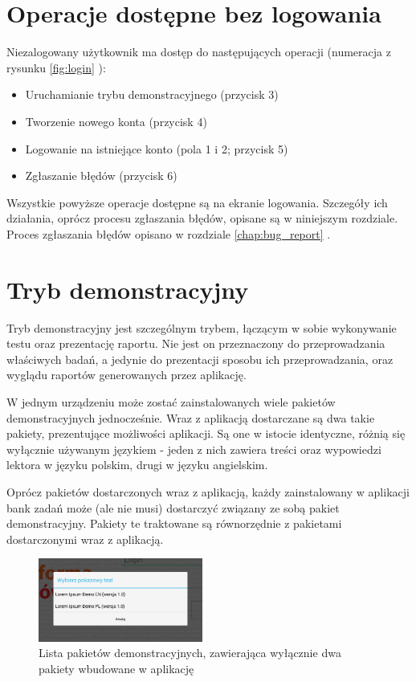 \documentclass[a4paper,10pt,twosided]{book}
\newcommand{\refwithpage}[3]{
\ref{#1}\ifthenelse{\equal{\thepage}{\pageref{#1}}}{}{#2\pageref{#1}#3}%
}
\newcommand{\pref}[1]{\refwithpage{#1}{ (strona }{)}}
\begin{document}
\section{Operacje dostępne bez logowania}

Niezalogowany użytkownik ma dostęp do następujących operacji (numeracja z rysunku \pref{fig:login}):

\begin{itemize}
\item Uruchamianie trybu demonstracyjnego (przycisk 3)
\item Tworzenie nowego konta (przycisk 4)
\item Logowanie na istniejące konto (pola 1 i 2; przycisk 5)
\item Zgłaszanie błędów (przycisk 6)
\end{itemize}

Wszystkie powyższe operacje dostępne są na ekranie logowania. Szczegóły ich działania, oprócz procesu zgłaszania błędów, opisane są w niniejszym rozdziale. Proces zgłaszania błędów opisano w rozdziale \pref{chap:bug_report}.


\section{Tryb demonstracyjny}
\label{sec:login_demo}

Tryb demonstracyjny jest szczególnym trybem, łączącym w sobie wykonywanie testu oraz prezentację raportu. Nie jest on przeznaczony do przeprowadzania właściwych badań, a jedynie do prezentacji sposobu ich przeprowadzania, oraz wyglądu raportów generowanych przez aplikację.

W jednym urządzeniu może zostać zainstalowanych wiele pakietów demonstracyjnych jednocześnie. Wraz z aplikacją dostarczane są dwa takie pakiety, prezentujące możliwości aplikacji. Są one w istocie identyczne, różnią się wyłącznie używanym językiem - jeden z nich zawiera treści oraz wypowiedzi lektora w języku polskim, drugi w języku angielskim.

Oprócz pakietów dostarczonych wraz z aplikacją, każdy zainstalowany w aplikacji bank zadań może (ale nie musi) dostarczyć związany ze sobą pakiet demonstracyjny. Pakiety te traktowane są równorzędnie z pakietami dostarczonymi wraz z aplikacją.

\begin{figure}
\vspace{-1em}
\includegraphics[width=0.48\textwidth]{activity_login-demos_list.png}
\caption{Lista pakietów demonstracyjnych, zawierająca wyłącznie dwa pakiety wbudowane w aplikację}
\label{fig:login_demo_list}
\end{figure}
\end{document}
